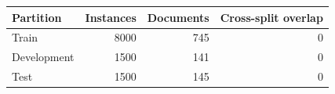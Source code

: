 \begin{tabular}{lrrr}
\toprule
Partition & Instances & Documents & Cross-split overlap \\
\midrule
Train & 8000 & 745 & 0 \\
Development & 1500 & 141 & 0 \\
Test & 1500 & 145 & 0 \\
\bottomrule
\end{tabular}
